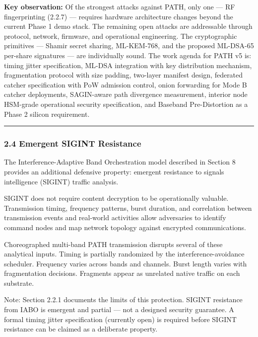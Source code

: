 \documentclass[
  11pt,
]{article}
\begin{document}
\textbf{Key observation:} Of the strongest attacks against PATH, only
one --- RF fingerprinting (2.2.7) --- requires hardware architecture
changes beyond the current Phase 1 demo stack. The remaining open
attacks are addressable through protocol, network, firmware, and
operational engineering. The cryptographic primitives --- Shamir secret
sharing, ML-KEM-768, and the proposed ML-DSA-65 per-share signatures ---
are individually sound. The work agenda for PATH v5 is: timing jitter
specification, ML-DSA integration with key distribution mechanism,
fragmentation protocol with size padding, two-layer manifest design,
federated catcher specification with PoW admission control, onion
forwarding for Mode B catcher deployments, SAGIN-aware path divergence
measurement, interior node HSM-grade operational security specification,
and Baseband Pre-Distortion as a Phase 2 silicon requirement.

\begin{center}\rule{0.5\linewidth}{0.5pt}\end{center}

\hypertarget{emergent-sigint-resistance}{%
\subsubsection{2.4 Emergent SIGINT
Resistance}\label{emergent-sigint-resistance}}

The Interference-Adaptive Band Orchestration model described in Section
8 provides an additional defensive property: emergent resistance to
signals intelligence (SIGINT) traffic analysis.

SIGINT does not require content decryption to be operationally valuable.
Transmission timing, frequency patterns, burst duration, and correlation
between transmission events and real-world activities allow adversaries
to identify command nodes and map network topology against encrypted
communications.

Choreographed multi-band PATH transmission disrupts several of these
analytical inputs. Timing is partially randomized by the
interference-avoidance scheduler. Frequency varies across bands and
channels. Burst length varies with fragmentation decisions. Fragments
appear as unrelated native traffic on each substrate.

Note: Section 2.2.1 documents the limits of this protection. SIGINT
resistance from IABO is emergent and partial --- not a designed security
guarantee. A formal timing jitter specification (currently open) is
required before SIGINT resistance can be claimed as a deliberate
property.
\end{document}
